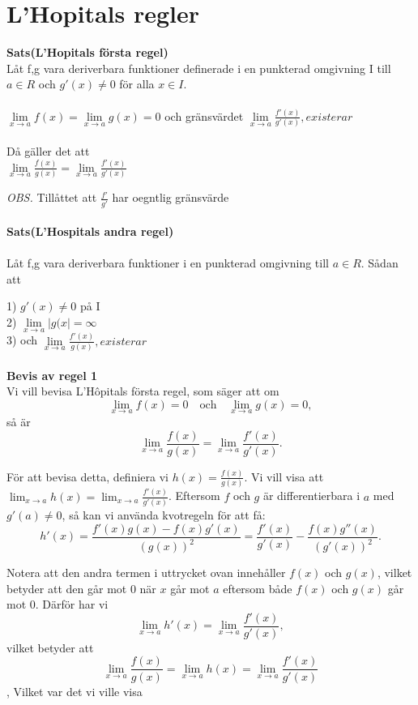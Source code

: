 \documentclass{article}
\begin{document}
	\section{L'Hopitals regler}
	\textbf{Sats(L'Hopitals första regel)} \\
	Låt f,g vara deriverbara funktioner definerade i en punkterad omgivning I till $a\in R $ och $g'(x)\neq0$ för alla $x\in I$.
	\\\\
	$\lim\limits_{x\to a} f(x)=\lim\limits_{x\to a} g(x) = 0$ och gränsvärdet $\lim\limits_{x\to a}\frac{f'(x)}{g'(x)}, existerar$ \\\\
	Då gäller det att \\
	$\lim\limits_{x\to a}\frac{f(x)}{g(x)}=\lim\limits_{x\to a}\frac{f'(x)}{g'(x)}$
	
	\textit{OBS.} Tillåttet att $\frac{f'}{g'}$ har oegntlig gränsvärde \\\\
	\textbf{Sats(L'Hospitals andra regel)} \\\\
	Låt f,g vara deriverbara funktioner i en punkterad omgivning till $a\in R$. Sådan att 
	
	 	1) $g'(x)\neq0$ på I \\ 
	 
		2) $\lim\limits_{x\to a} |g(x|=\infty$ \\
	
		3) och $\lim\limits_{x\to a}\frac{f'(x)}{g(x)}, existerar$
	\\\\
	\textbf{Bevis av regel 1}\\
	Vi vill bevisa L'Hôpitals första regel, som säger att om
	$$\lim_{x \to a} f(x) = 0 \quad \text{och} \quad \lim_{x \to a} g(x) = 0,$$
	så är
	$$\lim_{x \to a} \frac{f(x)}{g(x)} = \lim_{x \to a} \frac{f'(x)}{g'(x)}.$$ 
	
	För att bevisa detta, definiera vi $h(x) = \frac{f(x)}{g(x)}$. Vi vill visa att $\lim_{x \to a} h(x) = \lim_{x \to a} \frac{f'(x)}{g'(x)}$. Eftersom $f$ och $g$ är differentierbara i $a$ med $g'(a) \neq 0$, så kan vi använda kvotregeln för att få:
	$$h'(x) = \frac{f'(x)g(x) - f(x)g'(x)}{(g(x))^2} = \frac{f'(x)}{g'(x)} - \frac{f(x)g''(x)}{(g'(x))^2}.$$
	
	Notera att den andra termen i uttrycket ovan innehåller $f(x)$ och $g(x)$, vilket betyder att den går mot $0$ när $x$ går mot $a$ eftersom både $f(x)$ och $g(x)$ går mot $0$. Därför har vi
	$$\lim_{x \to a} h'(x) = \lim_{x \to a} \frac{f'(x)}{g'(x)},$$
	vilket betyder att
	$$\lim_{x \to a} \frac{f(x)}{g(x)} = \lim_{x \to a} h(x) = \lim_{x \to a} \frac{f'(x)}{g'(x)}$$,  Vilket var det vi ville visa 
\end{document}
